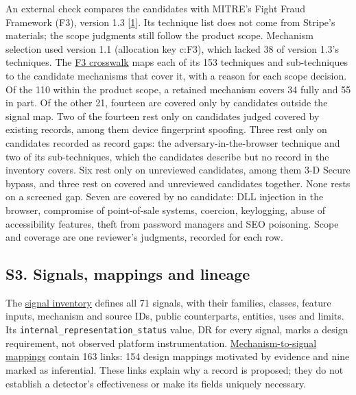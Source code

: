 \documentclass[
  11pt,
]{article}
\begin{document}
An external check compares the candidates with MITRE's Fight Fraud
Framework (F3), version 1.3
{[}\protect\hyperlink{ref-MITRE2026F3}{1}{]}. Its technique list does
not come from Stripe's materials; the scope judgments still follow the
product scope. Mechanism selection used version 1.1 (allocation key
c:F3), which lacked 38 of version 1.3's techniques. The
\href{SUPPLEMENT/S2_F3_CROSSWALK.csv}{F3 crosswalk} maps each of its 153
techniques and sub-techniques to the candidate mechanisms that cover it,
with a reason for each scope decision. Of the 110 within the product
scope, a retained mechanism covers 34 fully and 55 in part. Of the other
21, fourteen are covered only by candidates outside the signal map. Two
of the fourteen rest only on candidates judged covered by existing
records, among them device fingerprint spoofing. Three rest only on
candidates recorded as record gaps: the adversary-in-the-browser
technique and two of its sub-techniques, which the candidates describe
but no record in the inventory covers. Six rest only on unreviewed
candidates, among them 3-D Secure bypass, and three rest on covered and
unreviewed candidates together. None rests on a screened gap. Seven are
covered by no candidate: DLL injection in the browser, compromise of
point-of-sale systems, coercion, keylogging, abuse of accessibility
features, theft from password managers and SEO poisoning. Scope and
coverage are one reviewer's judgments, recorded for each row.

\FloatBarrier

\hypertarget{s3.-signals-mappings-and-lineage}{%
\subsection{S3. Signals, mappings and
lineage}\label{s3.-signals-mappings-and-lineage}}

\suppressfloats[t]

The \href{SUPPLEMENT/S3_SIGNALS.csv}{signal inventory} defines all 71
signals, with their families, classes, feature inputs, mechanism and
source IDs, public counterparts, entities, uses and limits. Its
\texttt{internal\_representation\_status} value, DR for every signal,
marks a design requirement, not observed platform instrumentation.
\href{SUPPLEMENT/S3_MECHANISM_SIGNAL_PAIRS.csv}{Mechanism-to-signal
mappings} contain 163 links: 154 design mappings motivated by evidence
and nine marked as inferential. These links explain why a record is
proposed; they do not establish a detector's effectiveness or make its
fields uniquely necessary.
\end{document}
